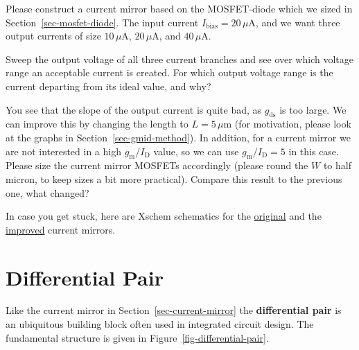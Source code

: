 \documentclass[
  a4paper,
  DIV=11,
  numbers=noendperiod]{scrartcl}
\begin{document}
\begin{tcolorbox}[enhanced jigsaw, titlerule=0mm, left=2mm, coltitle=black, toprule=.15mm, breakable, opacitybacktitle=0.6, colframe=quarto-callout-tip-color-frame, bottomtitle=1mm, toptitle=1mm, opacityback=0, colbacktitle=quarto-callout-tip-color!10!white, title=\textcolor{quarto-callout-tip-color}{\faLightbulb}\hspace{0.5em}{Exercise: Current Mirror}, arc=.35mm, rightrule=.15mm, colback=white, bottomrule=.15mm, leftrule=.75mm]

Please construct a current mirror based on the MOSFET-diode which we
sized in Section~\ref{sec-mosfet-diode}. The input current
\(I_\mathrm{bias} = 20\,\mu\text{A}\), and we want three output currents
of size \(10\,\mu\text{A}\), \(20\,\mu\text{A}\), and
\(40\,\mu\text{A}\).

Sweep the output voltage of all three current branches and see over
which voltage range an acceptable current is created. For which output
voltage range is the current departing from its ideal value, and why?

You see that the slope of the output current is quite bad, as
\(g_\mathrm{ds}\) is too large. We can improve this by changing the
length to \(L = 5\,\mu\text{m}\) (for motivation, please look at the
graphs in Section~\ref{sec-gmid-method}). In addition, for a current
mirror we are not interested in a high \(g_\mathrm{m}/I_\mathrm{D}\)
value, so we can use \(g_\mathrm{m}/I_\mathrm{D}= 5\) in this case.
Please size the current mirror MOSFETs accordingly (please round the
\(W\) to half micron, to keep sizes a bit more practical). Compare this
result to the previous one, what changed?

In case you get stuck, here are Xschem schematics for the
\href{./xschem/current_mirror.sch}{original} and the
\href{./xschem/current_mirror_improved.sch}{improved} current mirrors.

\end{tcolorbox}

\section{Differential Pair}\label{sec-diff-pair}

Like the current mirror in Section~\ref{sec-current-mirror} the
\textbf{differential pair} is an ubiquitous building block often used in
integrated circuit design. The fundamental structure is given in
Figure~\ref{fig-differential-pair}.
\end{document}
